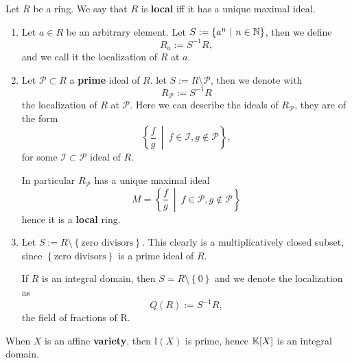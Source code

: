 \begin{defn}
	Let $R$ be a ring. We say that $R$ is \textbf{local} iff it has a unique maximal ideal.
\end{defn}

\begin{ex}\leavevmode\vspace{-.2\baselineskip}
	\begin{enumerate}
		\item Let $a \in R$ be an arbitrary element.
			Let $S := \left\{ a^n \ \middle|\ n \in \mathbb{N} \right\}$, then we define
			\begin{equation}
			R_a := S^{-1} R
			,\end{equation} 
			and we call it the localization of $R$ at $a$.
		\item Let $\mathcal{P} \subset R$ a \textbf{prime} ideal of $R$. let $S := R \setminus \mathcal{P}$, then we denote with
			\begin{equation}
				R_{\mathcal{P}} := S^{-1} R
			\end{equation} 
			the localization of $R$ at $\mathcal{P}$.
			Here we can describe the ideals of $R_{\mathcal{P}}$, they are of the form
			\begin{equation}
				\left\{ \frac{f}{g} \ \middle|\  f \in \mathcal{I}, g \not\in \mathcal{P} \right\}
			,\end{equation} 
			for some $\mathcal{I} \subset \mathcal{P}$ ideal of $R$.
			
			In particular $R_{\mathcal{P}}$ has a unique maximal ideal
			\begin{equation}
			M = \left\{ \frac{f}{g} \ \middle|\ f \in \mathcal{P}, g \not\in \mathcal{P} \right\}
			\end{equation}
			hence it is a \textbf{local} ring.
		\item Let $S := R \setminus \left\{ \text{zero divisors} \right\}$.
			This clearly is a multiplicatively closed subset, since $\left\{ \text{zero divisors} \right\}$ is a prime ideal of $R$.

			If $R$ is an integral domain, then $S = R \setminus \left\{ 0 \right\}$
			and we denote the localization as
			\begin{equation}
				Q(R) := S^{-1} R
			,\end{equation} 
			the field of fractions of R.
	\end{enumerate}
\end{ex} 

\begin{rem}
	When $X$ is an affine \textbf{variety}, then $\mathbb{I}(X)$ is prime, hence $\mathbb{K}[X]$ is an integral domain.
\end{rem}

